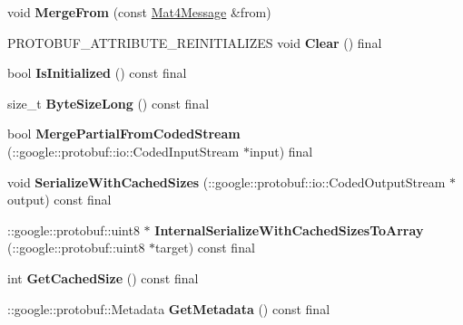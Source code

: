 \begin{DoxyCompactItemize}
\item 
\mbox{\label{classtbMath_1_1Mat4Message_a563fe8b49bb385a90dc9b2edc8531923}} 
void {\bfseries Merge\+From} (const \hyperlink{classtbMath_1_1Mat4Message}{Mat4\+Message} \&from)
\item 
\mbox{\label{classtbMath_1_1Mat4Message_ab1a26177e2512e35a6233704d0043ead}} 
P\+R\+O\+T\+O\+B\+U\+F\+\_\+\+A\+T\+T\+R\+I\+B\+U\+T\+E\+\_\+\+R\+E\+I\+N\+I\+T\+I\+A\+L\+I\+Z\+ES void {\bfseries Clear} () final
\item 
\mbox{\label{classtbMath_1_1Mat4Message_a4798c41a5962895e907069556a58f14c}} 
bool {\bfseries Is\+Initialized} () const final
\item 
\mbox{\label{classtbMath_1_1Mat4Message_a264b2c57afce8607c48b575ba5c9c4da}} 
size\+\_\+t {\bfseries Byte\+Size\+Long} () const final
\item 
\mbox{\label{classtbMath_1_1Mat4Message_a448d2459ebc5b60df18c7c94e5b4b971}} 
bool {\bfseries Merge\+Partial\+From\+Coded\+Stream} (\+::google\+::protobuf\+::io\+::\+Coded\+Input\+Stream $\ast$input) final
\item 
\mbox{\label{classtbMath_1_1Mat4Message_a471cb2b0c1329275ed928e84af4e0938}} 
void {\bfseries Serialize\+With\+Cached\+Sizes} (\+::google\+::protobuf\+::io\+::\+Coded\+Output\+Stream $\ast$output) const final
\item 
\mbox{\label{classtbMath_1_1Mat4Message_a263f17010bdf10b3d6f1d44d70a47b52}} 
\+::google\+::protobuf\+::uint8 $\ast$ {\bfseries Internal\+Serialize\+With\+Cached\+Sizes\+To\+Array} (\+::google\+::protobuf\+::uint8 $\ast$target) const final
\item 
\mbox{\label{classtbMath_1_1Mat4Message_a88c5976fc2d8bfe65ee28e8dbbb66435}} 
int {\bfseries Get\+Cached\+Size} () const final
\item 
\mbox{\label{classtbMath_1_1Mat4Message_ae9aaf67d3b36ded9721e64e639602e03}} 
\+::google\+::protobuf\+::\+Metadata {\bfseries Get\+Metadata} () const final

\end{DoxyCompactItemize}
